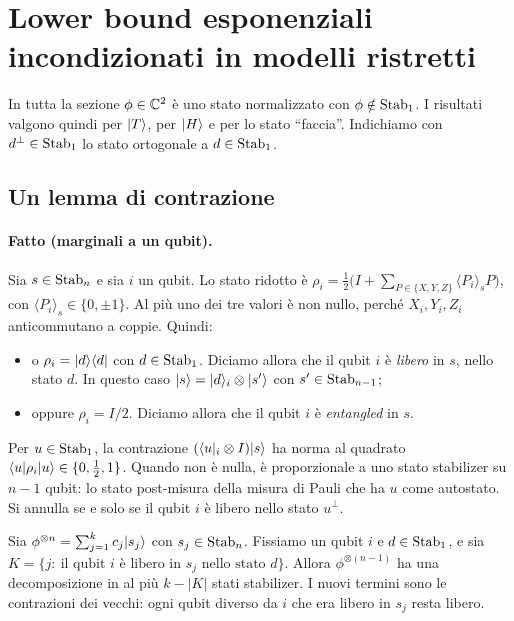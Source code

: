 \section{Lower bound esponenziali incondizionati in modelli ristretti}\label{sec:restricted}

In tutta la sezione $\phi\in\mathbb C^2$ è uno stato normalizzato con $\phi\notin\mathrm{Stab}_1$. I risultati valgono quindi per $\lvert T\rangle$, per $\lvert H\rangle$ e per lo stato ``faccia''. Indichiamo con $d^\perp\in\mathrm{Stab}_1$ lo stato ortogonale a $d\in\mathrm{Stab}_1$.

\subsection{Un lemma di contrazione}

\paragraph{Fatto (marginali a un qubit).} Sia $s\in\mathrm{Stab}_n$ e sia $i$ un qubit. Lo stato ridotto è $\rho_i=\tfrac12\bigl(I+\sum_{P\in\{X,Y,Z\}}\langle P_i\rangle_s P\bigr)$, con $\langle P_i\rangle_s\in\{0,\pm1\}$. Al più uno dei tre valori è non nullo, perché $X_i,Y_i,Z_i$ anticommutano a coppie. Quindi:
\begin{itemize}[leftmargin=1.5em]
\item o $\rho_i=\lvert d\rangle\langle d\rvert$ con $d\in\mathrm{Stab}_1$. Diciamo allora che il qubit $i$ è \emph{libero} in $s$, nello stato $d$. In questo caso $\lvert s\rangle=\lvert d\rangle_i\otimes\lvert s'\rangle$ con $s'\in\mathrm{Stab}_{n-1}$;
\item oppure $\rho_i=I/2$. Diciamo allora che il qubit $i$ è \emph{entangled} in $s$.
\end{itemize}
Per $u\in\mathrm{Stab}_1$, la contrazione $(\langle u\rvert_i\otimes I)\lvert s\rangle$ ha norma al quadrato $\langle u\rvert\rho_i\lvert u\rangle\in\{0,\tfrac12,1\}$. Quando non è nulla, è proporzionale a uno stato stabilizer su $n-1$ qubit: lo stato post-misura della misura di Pauli che ha $u$ come autostato. Si annulla se e solo se il qubit $i$ è libero nello stato $u^\perp$.

\begin{lemma}[contrazione]\label{lem:contr}
Sia $\phi^{\otimes n}=\sum_{j=1}^kc_j\lvert s_j\rangle$ con $s_j\in\mathrm{Stab}_n$. Fissiamo un qubit $i$ e $d\in\mathrm{Stab}_1$, e sia $K=\{j:\ \text{il qubit $i$ è libero in $s_j$ nello stato $d$}\}$. Allora $\phi^{\otimes(n-1)}$ ha una decomposizione in al più $k-|K|$ stati stabilizer. I nuovi termini sono le contrazioni dei vecchi: ogni qubit diverso da $i$ che era libero in $s_j$ resta libero.
\end{lemma}

